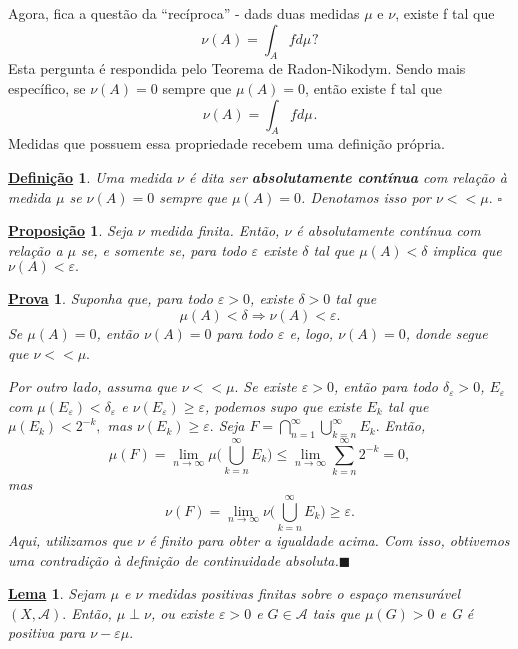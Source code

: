 \documentclass{article}
\newtheorem*{def*}{\underline{Defini\c c\~ao}}
\newtheorem*{lemma*}{\underline{Lema}}
\newtheorem*{prop*}{\underline{Proposi\c c\~ao}}
\newtheorem*{proof*}{\underline{Prova}}
\renewcommand\qedsymbol{$\blacksquare$}
\begin{document}
    Agora, fica a questão da ``recíproca'' - dads duas medidas \(\mu \) e \(\nu \), existe f tal que 
      \[
        \nu (A) = \int_{A}f d\mu_{}?
      \]
    Esta pergunta é respondida pelo Teorema de Radon-Nikodym. Sendo mais específico, se \(\nu (A) = 0\) sempre que \(\mu (A) = 0\), então existe f tal que 
      \[
        \nu (A) = \int_{A}f d\mu_{}.
      \]
    Medidas que possuem essa propriedade recebem uma definição própria.
\begin{def*}
  Uma medida \(\nu \) é dita ser \textbf{absolutamente contínua} com relação à medida \(\mu \) se 
\(\nu (A) = 0\) sempre que \(\mu (A) = 0\). Denotamos isso por \(\nu <<\mu .\) \(\square\)
\end{def*}
\begin{prop*}
  Seja \(\nu \) medida finita. Então, \(\nu \) é absolutamente contínua com relação a \(\mu \) se, e somente se, para todo \(\varepsilon \) existe \(\delta \) tal que \(\mu (A) < \delta \) implica que \(\nu (A) < \varepsilon .\)
\end{prop*} 
\begin{proof*}
  Suponha que, para todo \(\varepsilon > 0\), existe \(\delta > 0\) tal que 
    \[
      \mu (A) < \delta \Rightarrow \nu (A) < \varepsilon .
    \]
  Se \(\mu (A) = 0\), então \(\nu (A) = 0\) para todo \(\varepsilon \) e, logo, \(\nu (A) = 0\), donde segue que \(\nu << \mu .\)

  Por outro lado, assuma que \(\nu <<\mu .\) Se existe \(\varepsilon > 0\), então para todo \(\delta_{\varepsilon } > 0\), \(E_{\varepsilon }\) com \(\mu (E_{\varepsilon }) < \delta_{\varepsilon } \) e \(\nu (E_{\varepsilon })\geq \varepsilon \), podemos supo que existe 
 \(E_{k}\) tal que \(\mu (E_{k}) < 2^{-k},\) mas \(\nu (E_{k})\geq \varepsilon .\) Seja \(F = \bigcap_{n=1}^{\infty}\bigcup_{k=n}^{\infty}E_{k}.\) Então,
   \[
     \mu (F)=\lim_{n\to \infty}\mu \biggl(\bigcup_{k=n}^{\infty}E_{k}\biggr)\leq \lim_{n\to \infty}\sum\limits_{k=n}^{\infty}2^{-k} = 0,
   \]
  mas 
    \[
      \nu (F) = \lim_{n\to \infty}\nu \biggl(\bigcup_{k=n}^{\infty}E_{k}\biggr)\geq \varepsilon .
    \]
  Aqui, utilizamos que \(\nu \) é finito para obter a igualdade acima. Com isso, obtivemos uma contradição à definição de continuidade absoluta.\qedsymbol
\end{proof*}
\begin{lemma*}
  Sejam \(\mu \) e \(\nu \) medidas positivas finitas sobre o espaço mensurável \((X, \mathcal{A}).\) Então, \(\mu \perp \nu \), ou existe \(\varepsilon > 0\) e \(G\in \mathcal{A}\) tais que \(\mu (G) > 0\) e G é positiva para \(\nu - \varepsilon \mu .\)
\end{lemma*}
\end{document}
